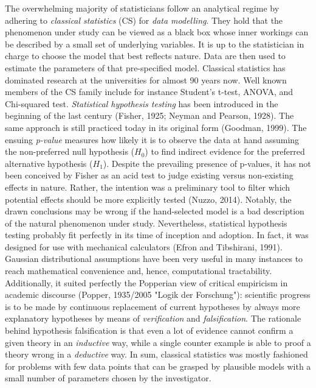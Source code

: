 \documentclass[authoryear,review,3p]{elsarticle}
\begin{document}
The overwhelming majority of statisticians
follow an analytical regime by
adhering to \textit{classical statistics} (CS) for
\textit{data modelling}.
They hold that the phenomenon under study can be viewed as a black box
whose inner workings can be described by a small set of
underlying variables.
It is up to the statistician in charge
to choose the model that best reflects nature.
Data are then used to estimate the parameters of that pre-specified model.
Classical statistics has dominated research at the universities
for almost 90 years now.
%
Well known members of the CS family include for instance
Student's t-test, ANOVA,
and Chi-squared test.
\textit{Statistical hypothesis testing} has been introduced in the beginning
of the last century (Fisher, 1925; Neyman and Pearson, 1928).
The same approach is still practiced today in its original form (Goodman, 1999).  
%
The ensuing \textit{p-value} measures how likely it is
to observe the data at hand
assuming the non-preferred null hypothesis ($H_0$)
to find indirect evidence
for the preferred alternative hypothesis ($H_1$).
%
Despite the prevailing presence of p-values,
it has not been conceived by Fisher as an acid test
to judge existing versus non-existing effects in nature.
Rather, the intention was a preliminary tool to
filter which potential effects should be more explicitly tested (Nuzzo, 2014).
%
Notably, the drawn conclusions may be wrong
if the hand-selected model is a bad description of
the natural phenomenon under study.
%
Nevertheless, statistical hypothesis testing probably fit perfectly
in its time of inception and adoption.
In fact, it was designed for use with mechanical calculators
(Efron and Tibshirani, 1991).
Gaussian distributional assumptions
have been very useful in many instances to reach
mathematical convenience and, hence, computational tractability.
Additionally, it suited perfectly the Popperian view of
critical empiricism in academic discourse
(Popper, 1935/2005 "Logik der Forschung"):
scientific progress is to be made by continuous replacement of current
hypotheses by always more explanatory hypotheses
by means of \textit{verification} and \textit{falsification}.
The rationale behind hypothesis falsification
is that even a lot of evidence cannot confirm
a given theory in an \textit{inductive} way, 
while a single counter example is able to proof a theory wrong
in a \textit{deductive} way.
%
In sum,
classical statistics was mostly fashioned
for problems with few data points that can be grasped 
by plausible models with a small number of parameters chosen by the
investigator.
\end{document}
